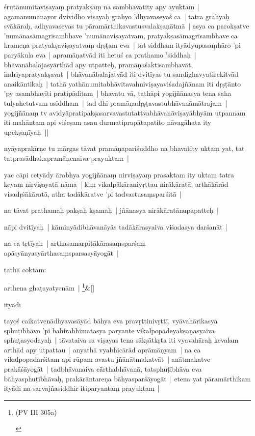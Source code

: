 \documentclass[article,12pt,a4paper]{memoir}
\begin{document}
	  \pstart śrutānumitaviṣayaṃ pratyakṣaṃ na sambhavatīty apy ayuktam | āgamānumānayor dvividho viṣayaḥ grāhyo 'dhyavaseyaś ca | tatra grāhyaḥ svākāraḥ, adhyavaseyas tu pāramārthikavastusvalakṣaṇātmā | asya ca parokṣatve 'numānasāmagrīsambhave 'numānaviṣayatvam, pratyakṣasāmagrīsambhave ca krameṇa pratyakṣaviṣayatvaṃ dṛṣṭam eva | tat siddham ityādyupasaṃhāro 'pi paryākula eva | apramāṇatvād iti hetuś ca prathamo 'siddhaḥ | bhāvanābalajasyārthād apy utpatteḥ, pramāṇaśaktisambhavāt, indriyapratyakṣavat | bhāvanābalajatvād iti dvitīyas tu sandighavyatirekitvād anaikāntikaḥ | tathā yathānumitabhāvitavahniviṣayaviśadajñānam iti dṛṣṭānto 'py asambhavīti pratipāditam | bhavatu vā, tathāpi yogijñānasya tena saha tulyahetutvam asiddham | tad dhi pramāṇadṛṣṭavastubhāvanāmātrajam | yogijñānaṃ tv avidyāpratipakṣasarvavastutattvabhāvanāviṣayābhyām utpannam iti mahāntam api viśeṣam asau durmatiprapātapatito nāvagāhata ity upekṣaṇīyaḥ || 
	\pend
      

	  \pstart nyāyaprakīrṇe tu mārgas tāvat pramāṇapariśuddho na bhavatīty uktaṃ yat, tat tatprasādhakapramāṇenaiva prayuktam | 
	\pend
      

	  \pstart yac cāpi cetyādy ārabhya yogijñānaṃ nirviṣayaṃ prasaktam ity uktam tatra keyaṃ nirviṣayatā nāma | kiṃ vikalpākāranivṛttau nirākāratā, arthākārād visadṛśākāratā, atha tadākāratve 'pi tadvastusaṃsparśitā | 
	\pend
      

	  \pstart na tāvat prathamaḥ pakṣaḥ kṣamaḥ | jñānasya nirākāratānupapatteḥ | 
	\pend
      

	  \pstart nāpi dvitīyaḥ | kāminyādibhāvanāyās tadākārasyaiva viśadasya darśanāt | 
	\pend
      

	  \pstart na ca tṛtīyaḥ | arthasamarpitākārasaṃsparśam apāsyānyasyārthasaṃsparsasyāyogāt | 
	\pend
      

	  \pstart tathā coktam:
	\pend
      
	    
	    \stanza[\smallbreak]
	arthena ghaṭayatyenām | \footnote{\begin{english}(PV III 305a)\end{english}}\&[\smallbreak]


	

	  \pstart ityādi
	\pend
      

	  \pstart tayoś caikatvenādhyavasāyād bāhya eva pravṛttinivṛttī, vyāvahārikasya sphuṭībhāvo 'pi bahirabhimatasya paryante vikalpopādeyakṣaṇasyaiva sphuṭasyodayaḥ | tāvataiva sa viṣayas tena sākṣātkṛta iti vyavahāraḥ kevalam arthād apy utpattau | anyathā vyabhicārād aprāmāṇyam | na ca vikalpopadarśitam api rūpam avastu jñānātmakatvāt | anātmakatve prakāśāyogāt | tadbhāvanaiva cārthabhāvanā, tatsphuṭībhāva eva bāhyasphuṭībhāvaḥ, prakārāntareṇa bāhyasparśāyogāt | etena yat pāramārthikam ityādi na sarvajñasiddhir itiparyantaṃ prayuktam | 
	\pend
      
\end{document}
